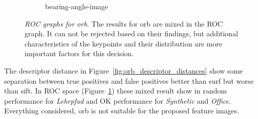 \begin{figure}[htp]
\begin{subfigure}[t]{0.45\linewidth}
    \caption{\gls{bearing-angle-image}}
\end{subfigure}
\caption[\acrshort{ROC} graphs for \acrshort{orb}]{\emph{\acrshort{ROC} graphs for \acrshort{orb}.} The results for \acrshort{orb} are mixed in the \acrshort{ROC} graph. It can not be rejected based on their findings, but additional characteristics of the keypoints and their distribution are more important factors for this decision.}\label{fig:orb_roc}
\end{figure}
The descriptor distance in Figure~\ref{fig:orb_descriptor_distances} show some separation between true positives and false positives better than \acrshort{surf} but worse than \acrshort{sift}.
In \acrshort{ROC} space (Figure~\ref{fig:orb_roc}) these mixed result show in random performance for \emph{Lehrpfad} and OK performance for \emph{Synthetic} and \emph{Office}.
Everything considered, \acrshort{orb} is not suitable for the proposed feature images.
